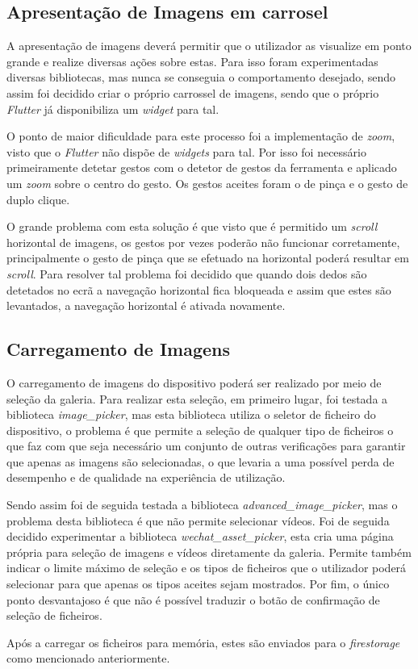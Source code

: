 \newpage

\subsection{Apresentação de Imagens em carrosel}

A apresentação de imagens deverá permitir que o utilizador as visualize em ponto grande e realize diversas ações sobre estas. Para isso foram experimentadas diversas bibliotecas, mas nunca se conseguia o comportamento desejado, sendo assim foi decidido criar o próprio carrossel de imagens, sendo que o próprio \textit{Flutter} já disponibiliza um \textit{widget} para tal.

O ponto de maior dificuldade para este processo foi a implementação de \textit{zoom}, visto que o \textit{Flutter} não dispõe de \textit{widgets} para tal. Por isso foi necessário primeiramente detetar gestos com o detetor de gestos da ferramenta e aplicado um \textit{zoom} sobre o centro do gesto. Os gestos aceites foram o de pinça e o gesto de duplo clique.

O grande problema com esta solução é que visto que é permitido um \textit{scroll} horizontal de imagens, os gestos por vezes poderão não funcionar corretamente, principalmente o gesto de pinça que se efetuado na horizontal poderá resultar em \textit{scroll}. Para resolver tal problema foi decidido que quando dois dedos são detetados no ecrã a navegação horizontal fica bloqueada e assim que estes são levantados, a navegação horizontal é ativada novamente.

\subsection{Carregamento de Imagens}

O carregamento de imagens do dispositivo poderá ser realizado por meio de seleção da galeria. Para realizar esta seleção, em primeiro lugar, foi testada a biblioteca \textit{image\_picker}, mas esta biblioteca utiliza o seletor de ficheiro do dispositivo, o problema é que permite a seleção de qualquer tipo de ficheiros o que faz com que seja necessário um conjunto de outras verificações para garantir que apenas as imagens são selecionadas, o que levaria a uma possível perda de desempenho e de qualidade na experiência de utilização.

Sendo assim foi de seguida testada a biblioteca \textit{advanced\_image\_picker}, mas o problema desta biblioteca é que não permite selecionar vídeos. Foi de seguida decidido experimentar a biblioteca \textit{wechat\_asset\_picker}, esta cria uma página própria para seleção de imagens e vídeos diretamente da galeria. Permite também indicar o limite máximo de seleção e os tipos de ficheiros que o utilizador poderá selecionar para que apenas os tipos aceites sejam mostrados. Por fim, o único ponto desvantajoso é que não é possível traduzir o botão de confirmação de seleção de ficheiros.

Após a carregar os ficheiros para memória, estes são enviados para o \textit{firestorage} como mencionado anteriormente.